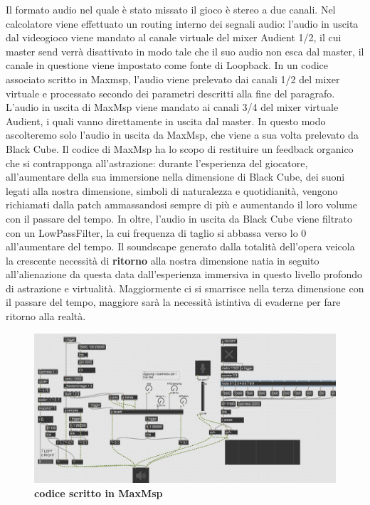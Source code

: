 	Il formato audio nel quale è stato missato il gioco è stereo a due canali. Nel calcolatore viene effettuato un routing interno dei segnali audio: l'audio in uscita dal videogioco viene mandato al canale virtuale del mixer Audient 1/2, il cui master send verrà disattivato in modo tale che il suo audio non esca dal master, il canale in questione viene impostato come fonte di Loopback. In un codice associato scritto in Maxmsp, l'audio viene prelevato dai canali 1/2 del mixer virtuale e processato secondo dei parametri descritti alla fine del paragrafo. L'audio in uscita di MaxMsp viene mandato ai canali 3/4 del mixer virtuale Audient, i quali vanno direttamente in uscita dal master. In questo modo ascolteremo solo l'audio in uscita da MaxMsp, che viene a sua volta prelevato da Black Cube.
	Il codice di MaxMsp ha lo scopo di restituire un feedback organico che si contrapponga all'astrazione: durante l'esperienza del giocatore, all'aumentare della sua immersione nella dimensione di Black Cube, dei suoni legati alla nostra dimensione, simboli di naturalezza e quotidianità, vengono richiamati dalla patch ammassandosi sempre di più e aumentando il loro volume con il passare del tempo.
	In oltre, l'audio in uscita da Black Cube viene filtrato con un LowPassFilter, la cui frequenza di taglio si abbassa verso lo 0 all'aumentare del tempo.
	Il soundscape generato dalla totalità dell'opera veicola la crescente necessità di \textbf{ritorno} alla nostra dimensione natia in seguito all'alienazione da questa data dall'esperienza immersiva in questo livello profondo di astrazione e virtualità. Maggiormente ci si smarrisce nella terza dimensione con il passare del tempo, maggiore sarà la necessità istintiva di evaderne per fare ritorno alla realtà.

\newpage

	\begin{figure}[h]
			\hspace{1cm}\includegraphics[width=.9\textwidth]{img/image8.jpg}
			\caption{\textbf{codice scritto in MaxMsp}}
			\label{gr01}
	\end{figure}
	

